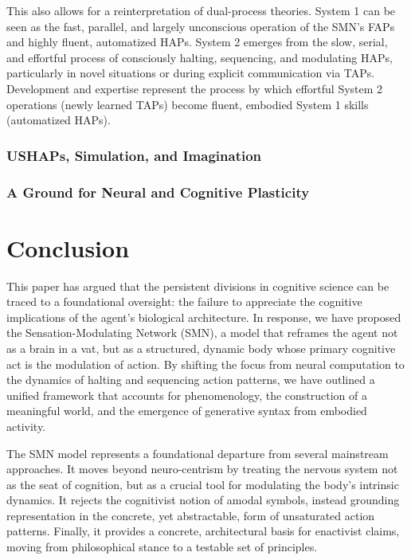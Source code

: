 \documentclass[10pt,letterpaper]{article}
\begin{document}
This also allows for a reinterpretation of dual-process theories. System 1 can be seen as the fast, parallel, and largely unconscious operation of the SMN's FAPs and highly fluent, automatized HAPs. System 2 emerges from the slow, serial, and effortful process of consciously halting, sequencing, and modulating HAPs, particularly in novel situations or during explicit communication via TAPs. Development and expertise represent the process by which effortful System 2 operations (newly learned TAPs) become fluent, embodied System 1 skills (automatized HAPs).

\subsubsection*{USHAPs, Simulation, and Imagination}

\subsubsection*{A Ground for Neural and Cognitive Plasticity}

\section{Conclusion}
This paper has argued that the persistent divisions in cognitive science can be traced to a foundational oversight: the failure to appreciate the cognitive implications of the agent's biological architecture. In response, we have proposed the Sensation-Modulating Network (SMN), a model that reframes the agent not as a brain in a vat, but as a structured, dynamic body whose primary cognitive act is the modulation of action. By shifting the focus from neural computation to the dynamics of halting and sequencing action patterns, we have outlined a unified framework that accounts for phenomenology, the construction of a meaningful world, and the emergence of generative syntax from embodied activity.

The SMN model represents a foundational departure from several mainstream approaches. It moves beyond neuro-centrism by treating the nervous system not as the seat of cognition, but as a crucial tool for modulating the body's intrinsic dynamics. It rejects the cognitivist notion of amodal symbols, instead grounding representation in the concrete, yet abstractable, form of unsaturated action patterns. Finally, it provides a concrete, architectural basis for enactivist claims, moving from philosophical stance to a testable set of principles.
\end{document}
